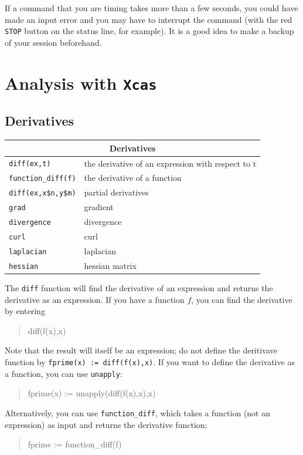 \documentclass{article}
\newcommand{\xcasin}[1]
{\begin{quote}\ttfamily
#1
\end{quote}}
\begin{document}
If a command that you are timing takes more than a few seconds, you
could have made an input error and you may have to interrupt the
command (with the red \texttt{STOP} button on the status line, for
example).  It is a good idea to make a backup of your session beforehand.

\section{Analysis with \texttt{Xcas}}

\subsection{Derivatives}
\label{deriv}

\begin{center}
\begin{tabular}{|p{}|p{}|}
\hline
\multicolumn{2}{|c|}{\textbf{Derivatives}}\\
\hline\hline
\texttt{diff(ex,t)} & the derivative of an expression with respect to t\\
\texttt{function\_diff(f)} & the derivative of a function\\
\texttt{diff(ex,x\$n,y\$m)} & partial derivatives\\
\texttt{grad} & gradient\\ 
\texttt{divergence} & divergence\\
\texttt{curl} & curl\\
\texttt{laplacian} & laplacian\\
\texttt{hessian} & hessian matrix\\
\hline
\end{tabular}
\end{center}

The \texttt{diff} function will find the derivative of an expression
and returns the derivative as an expression.  If you have a function
$f$, you can find the derivative by entering
\xcasin{diff(f(x),x)}
Note that the result will itself be an expression; do not define the
deritivave function by \texttt{fprime(x) := diff(f(x),x)}.  If you
want to define the derivative as a function, you can use
\texttt{unapply}:
\xcasin{fprime(x) := unapply(diff(f(x),x),x)}
Alternatively, you can use \texttt{function\_diff}, which takes a
function (not an expression) as input and returns the derivative
function;
\xcasin{fprime := function\_diff(f)}
\end{document}
